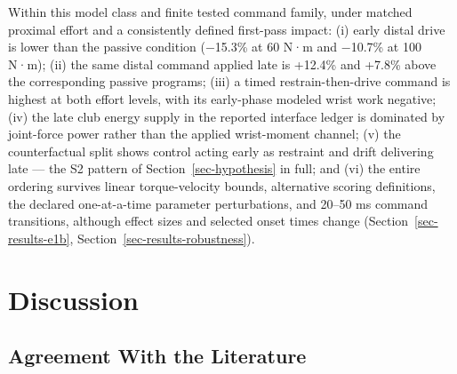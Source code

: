 \documentclass[
  letterpaper,
]{report}
\begin{document}
Within this model class and finite tested command family, under matched
proximal effort and a consistently defined first-pass impact: (i) early
distal drive is lower than the passive condition (−15.3\% at 60 N·m and
−10.7\% at 100 N·m); (ii) the same distal command applied late is
+12.4\% and +7.8\% above the corresponding passive programs; (iii) a
timed restrain-then-drive command is highest at both effort levels, with
its early-phase modeled wrist work negative; (iv) the late club energy
supply in the reported interface ledger is dominated by joint-force
power rather than the applied wrist-moment channel; (v) the
counterfactual split shows control acting early as restraint and drift
delivering late --- the S2 pattern of Section~\ref{sec-hypothesis} in
full; and (vi) the entire ordering survives linear torque-velocity
bounds, alternative scoring definitions, the declared one-at-a-time
parameter perturbations, and 20--50 ms command transitions, although
effect sizes and selected onset times change
(Section~\ref{sec-results-e1b}, Section~\ref{sec-results-robustness}).

\chapter{Discussion}\label{sec-discussion}

\section{Agreement With the Literature}\label{sec-discussion-agreement}
\end{document}
